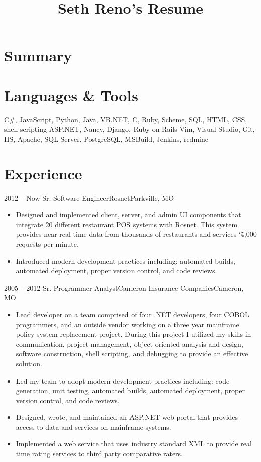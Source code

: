 \documentclass[11pt,letterpaper,final]{moderncv}
\title{Seth Reno's Resume}
\begin{document}
\maketitle
\section{Summary}

\section{Languages \& Tools} 
{C\#, JavaScript, Python, Java, VB.NET, C, Ruby, Scheme, SQL, HTML, CSS, shell scripting}
{ASP.NET, Nancy, Django, Ruby on Rails}
{Vim, Visual Studio, Git, IIS, Apache, SQL Server, PostgreSQL, MSBuild, Jenkins, redmine}

\section{Experience} 
	\cventry
{2012 -- Now} {Sr. Software Engineer}{Rosnet}{Parkville, MO}{}{
		\begin{itemize}
			\item
Designed and implemented client, server, and admin UI components that integrate 20 different
restaurant POS systems with Rosnet. This system provides near real-time data from thousands
of restaurants and services \char`\~4,000 requests per minute.
			\item
Introduced modern development practices including: automated builds, automated deployment,
proper version control, and code reviews.
    \end{itemize}
}
	\cventry
{2005 -- 2012} {Sr. Programmer Analyst}{Cameron Insurance Companies}{Cameron, MO}{}{
		\begin{itemize}
			\item 
Lead developer on a team comprised of four .NET developers, four COBOL programmers, and an outside
vendor working on a three year mainframe policy system replacement project. During this project I
utilized my skills in communication, project management, object oriented analysis and design, software
construction, shell scripting, and debugging to provide an effective solution.
			\item 
Led my team to adopt modern development practices including: code generation, unit testing,
automated builds, automated deployment, proper version control, and code reviews.
			\item 
Designed, wrote, and maintained an ASP.NET web portal that provides access to data and services on
mainframe systems.
			\item 
Implemented a web service that uses industry standard XML to provide real time rating services to third
party comparative raters.
		\end{itemize}
}
\end{document}
